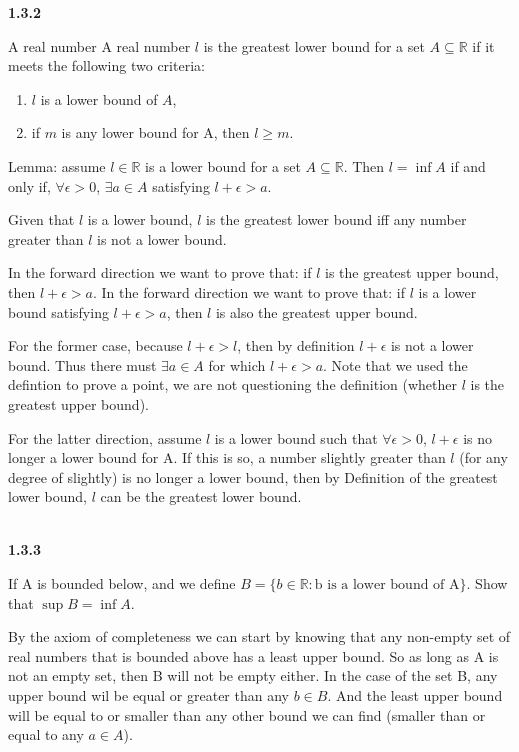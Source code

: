 \textbf{1.3.2}

A real number A real number $l$ is the greatest lower bound for a set $A \subseteq \mathbb{R}$ if it meets the following
two criteria:

\begin{enumerate}
    \item $l$ is a lower bound of $A$,
    \item if $m$ is any lower bound for A, then $l \geq m$.
\end{enumerate}

Lemma: assume $l \in \mathbb{R}$ is a lower bound for a set $A \subseteq \mathbb{R}$.
Then $l = \inf{A}$ if and only if, $\forall \epsilon > 0$, $\exists a \in A$ satisfying $l + \epsilon > a$.

Given that $l$ is a lower bound, $l$ is the greatest lower bound iff any number greater than $l$ is not a lower bound.

In the forward direction we want to prove that: if $l$ is the greatest upper bound, then $l+\epsilon > a$.
In the forward direction we want to prove that: if $l$ is a lower bound satisfying $l+\epsilon > a$, then $l$ is also the
greatest upper bound.

For the former case, because $l + \epsilon > l$, then by definition $l+\epsilon$ is not a lower bound. Thus there must
$\exists a \in A$ for which $l+\epsilon > a$.
Note that we used the defintion to prove a point, we are not questioning the definition (whether $l$ is the greatest upper bound).

For the latter direction, assume $l$ is a lower bound such that $\forall \epsilon >0$, $l+\epsilon$ is no longer a lower bound
for A.
If this is so, a number slightly greater than $l$ (for any degree of slightly) is no longer a lower bound, then by Definition
of the greatest lower bound, $l$ can be the greatest lower bound.
\\~\\


\label{abbott:1.3.3}

\textbf{1.3.3}


If A is bounded below, and we define $B = \{ b \in \mathbb{R}: \text{b is a lower bound of A} \}$.
Show that $\sup B = \inf A$.

By the axiom of completeness we can start by knowing that any non-empty set of real numbers that is bounded above
has a least upper bound.
So as long as A is not an empty set, then B will not be empty either.
In the case of the set B, any upper bound wil be equal or greater than any $b \in B$.
And the least upper bound will be equal to or smaller than any other bound we can find (smaller than or equal to
any $a \in A$).

